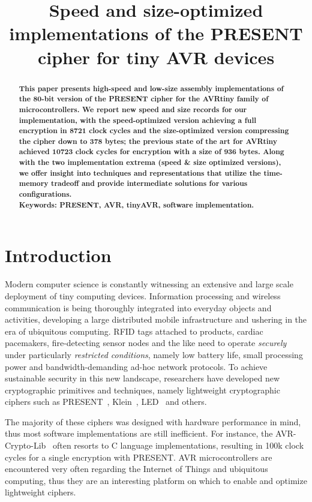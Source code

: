 \documentclass[11pt]{article}
\begin{document}
\title{Speed and size-optimized implementations of the PRESENT cipher for tiny AVR devices}

\author{}
\date{}
\maketitle

\begin{abstract}
\textbf{This paper presents high-speed and low-size assembly implementations of the 80-bit version of the PRESENT cipher for the AVRtiny family of microcontrollers. We report new speed and size records for our implementation, with the speed-optimized version achieving a full encryption in 8721 clock cycles and the size-optimized version compressing the cipher down to 378 bytes; the previous state of the art for AVRtiny achieved 10723 clock cycles for encryption with a size of 936 bytes. Along with the two implementation extrema (speed \& size optimized versions), we offer insight into techniques and representations that utilize the time-memory tradeoff and provide intermediate solutions for various configurations.\\Keywords: PRESENT, AVR, tinyAVR, software implementation.}
\end{abstract}
\section{Introduction}
Modern computer science is constantly witnessing an extensive and large scale deployment of tiny computing devices. Information processing and wireless communication is being thoroughly integrated into everyday objects and activities, developing a large distributed mobile infrastructure and ushering in the era of ubiquitous computing. RFID tags attached to products, cardiac pacemakers, fire-detecting sensor nodes and the like need to operate \emph{securely} under particularly \emph{restricted conditions}, namely low battery life, small processing power and bandwidth-demanding ad-hoc network protocols. To achieve sustainable security in this new landscape, researchers have developed new cryptographic primitives and techniques, namely lightweight cryptographic ciphers such as PRESENT~\cite{bogdanov2007present}, Klein~\cite{gong2012klein}, LED~\cite{guo2011led} and others.

The majority of these ciphers was designed with hardware performance in mind, thus most software implementations are still inefficient. For instance, the AVR-Crypto-Lib~\cite{avr_crypto_lib} often resorts to C language implementations, resulting in 100k clock cycles for a single encryption with PRESENT. AVR microcontrollers are encountered very often regarding the Internet of Things and ubiquitous computing, thus they are an interesting platform on which to enable and optimize lightweight ciphers.
\end{document}
